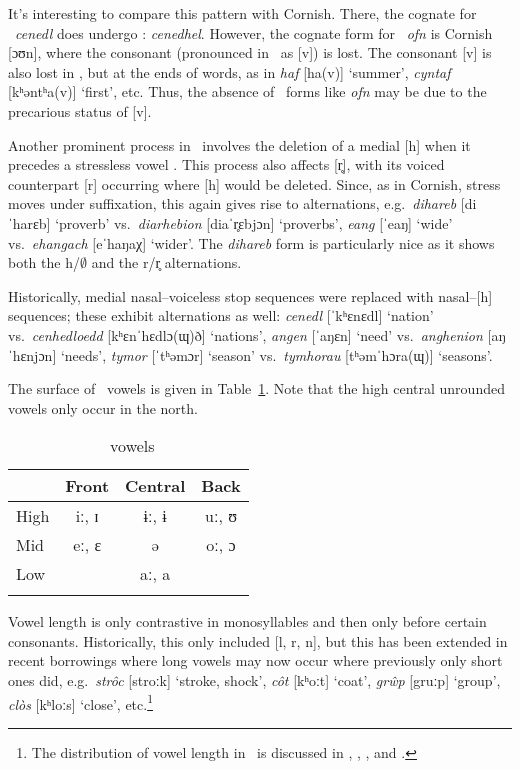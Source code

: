 \documentclass[output=paper,colorlinks,citecolor=brown]{langscibook}
\begin{document}
It's interesting to compare this pattern with Cornish. There, the cognate for \w\ \emph{cenedl} does undergo : \emph{cenedhel}. However, the cognate form for \w\ \emph{ofn} is Cornish  [ɔʊn], where the consonant (pronounced in \w\ as [v]) is lost. The consonant [v] is also lost in \w, but at the ends of words, as in \emph{haf} [ha(v)] `summer', \emph{cyntaf} [kʰəntʰa(v)] `first', etc. Thus, the absence of    \w\ forms like \emph{ofn} may be due to the precarious status of [v].

Another prominent process in \w\ involves the deletion of a medial [h] when it precedes a stressless vowel \citep{hammond.h}. This process also affects [r̥], with its voiced counterpart [r] occurring where [h] would be deleted. Since, as in Cornish, stress moves under suffixation, this again gives rise to alternations, e.g.\ \emph{dihareb} [diˈharɛb] `proverb' vs.\ \emph{diarhebion} [diaˈr̥ɛbjɔn] `proverbs', \emph{eang} [ˈeaŋ] `wide' vs.\ \emph{ehangach} [eˈhaŋaχ] `wider'. The \emph{dihareb} form is particularly nice as it shows both the h/$\emptyset$ and the r/r̥ alternations.

Historically, medial nasal--voiceless stop sequences were replaced with nasal--[h] sequences; these exhibit alternations as well:
\emph{cenedl} [ˈkʰɛnɛdl] `nation' vs.\ \emph{cenhedloedd} [kʰɛnˈhɛdlɔ(ɰ)ð] `nations',
\emph{angen} [ˈaŋɛn] `need' vs.\ \emph{anghenion} [aŋˈhɛnjɔn] `needs',
\emph{tymor} [ˈtʰəmɔr] `season' vs.\ \emph{tymhorau} [tʰəmˈhɔra(ɰ)] `seasons'.

The surface  of \w\ vowels is given in Table~\ref{welsh.vowels.tab}. Note that the high central unrounded vowels only occur in the north.

\begin{table}
\caption{\w\ vowels}
\label{welsh.vowels.tab}
\begin{tabular}[t]{lccc}
\lsptoprule
         & Front & Central & Back \\
\midrule
High     & iː, ɪ  & ɨː, ɨ    & uː, ʊ \\
Mid      & eː, ɛ  & ə       & oː, ɔ \\
Low      &                 & aː, a  \\
\lspbottomrule
\end{tabular}
\end{table}

Vowel length is only contrastive in monosyllables and then only before certain consonants. Historically, this only included [l, r, n], but this has been extended in recent borrowings where long vowels may now occur where previously only short ones did, e.g.\ \emph{str\^oc} [stroːk] `stroke, shock', \emph{c\^ot} [kʰoːt] `coat', \emph{gr\^wp} [gruːp] `group', \emph{cl\`os} [kʰloːs] `close', etc.\footnote{The distribution of vowel length in \w\ is discussed in \citet{awbery.tactics}, \citet{hannahs.book}, \citet{iosad.vowels}, and \citet{bell}.}
\end{document}
